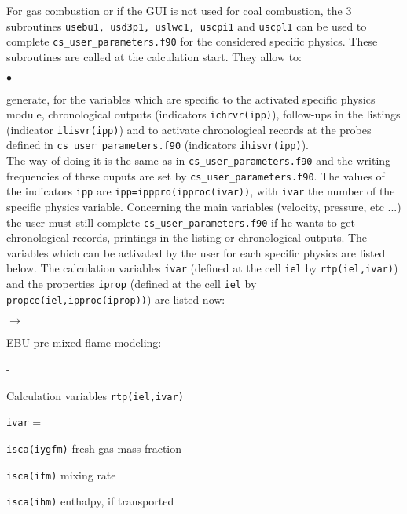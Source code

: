 {{For gas combustion or if the GUI is not used for coal combustion, the 3 subroutines \texttt{usebu1, usd3p1, uslwc1, uscpi1} and \texttt{uscpl1} can be used to complete \texttt{cs\_user\_parameters.f90} for the
considered specific physics. These subroutines are called at the calculation start.
They allow to:
\begin{list}{$\bullet$}{}
\item generate, for the variables which are specific to the activated
             specific physics module, chronological outputs (indicators
             \texttt{ichrvr(ipp)}), follow-ups in the listings
             (indicator \texttt{ilisvr(ipp)}) and to activate
             chronological records at the probes defined in
             \texttt{cs\_user\_parameters.f90} (indicators \texttt{ihisvr(ipp)}).\\
The way of doing it is the same as in \texttt{cs\_user\_parameters.f90} and the writing
      frequencies of these ouputs are set by \texttt{cs\_user\_parameters.f90}. The values
      of the indicators \texttt{ipp} are
      \texttt{ipp=ipppro(ipproc(ivar))}, with \texttt{ivar}
      the number of the specific physics variable.
Concerning the main variables (velocity, pressure, etc ...) the user
      must still complete \texttt{cs\_user\_parameters.f90} if he wants to get
      chronological records, printings in the listing or chronological
      outputs.
The variables which can be activated by the user for each specific
      physics are listed below. The calculation variables \texttt{ivar} (defined
      at the cell \texttt{iel} by \texttt{rtp(iel,ivar)}) and the properties
      \texttt{iprop} (defined at the cell \texttt{iel} by
      \texttt{propce(iel,ipproc(iprop))}) are listed now:
      \begin{list}{$\rightarrow$}{}
       \item EBU pre-mixed flame modeling:
       \begin{list}{-}{}
        \item Calculation variables \texttt{rtp(iel,ivar)}
              \begin{list}{\texttt{ivar} = }{}
               \item \texttt{isca(iygfm)} fresh gas mass fraction
               \item \texttt{isca(ifm)} mixing rate
               \item \texttt{isca(ihm)} enthalpy, if transported
              \end{list}

\end{list}
\end{list}
\end{list}}}
